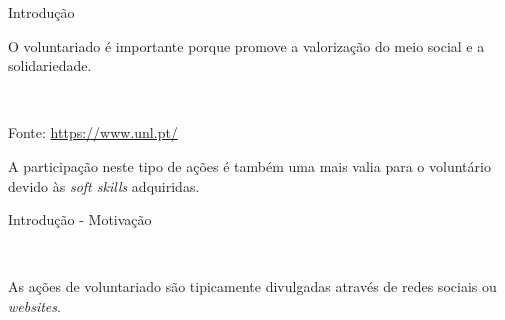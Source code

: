\begin{frame}{Introdução}

\vspace*{-3em}

O voluntariado é importante porque promove a valorização do meio social e a solidariedade.

\\

\vspace*{-1em}
\begin{center}
	{\small Fonte: \url{https://www.unl.pt/}}
\end{center}
\vspace*{-1em}

A participação neste tipo de ações é também uma mais valia para o voluntário devido às \textit{soft skills} adquiridas.

\end{frame}


\begin{frame}{Introdução - Motivação}

\vspace*{-2em}
\\

\vspace*{2em}

{\normalsize As ações de voluntariado são tipicamente divulgadas através de redes sociais ou \textit{websites}. }

\end{frame}

